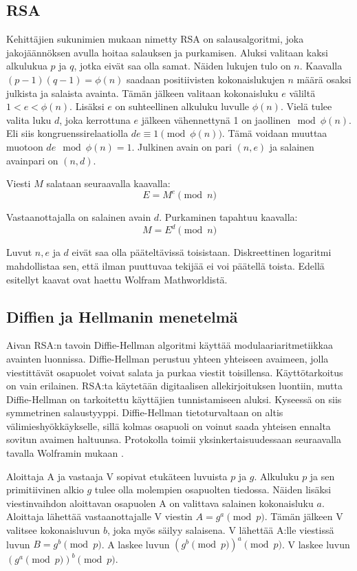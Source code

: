 \documentclass[finnish]{tktltiki2}
\theoremstyle{definition}
\theoremstyle{remark}
\begin{document}
\subsection{RSA}

Kehittäjien sukunimien mukaan nimetty RSA on salausalgoritmi, joka jakojäännöksen avulla hoitaa salauksen ja purkamisen. Aluksi valitaan kaksi alkulukua $p$ ja $q$, jotka eivät saa olla samat. Näiden lukujen tulo on $n$. Kaavalla $(p-1)(q-1) = \phi(n)$ saadaan positiivisten kokonaislukujen $n$ määrä osaksi julkista ja salaista avainta. Tämän jälkeen valitaan kokonaisluku $e$ väliltä $1 < e < \phi(n)$. Lisäksi $e$ on suhteellinen alkuluku luvulle $\phi(n)$. Vielä tulee valita luku $d$, joka kerrottuna $e$ jälkeen vähennettynä 1 on jaollinen$\mod{\phi(n)}$. Eli siis kongruenssirelaatiolla $d e \equiv 1\pmod{\phi(n)}$. Tämä voidaan muuttaa muotoon $de \mod{\phi(n)} = 1$. Julkinen avain on pari $(n, e)$ ja salainen avainpari on $(n, d)$.   

Viesti $M$ salataan seuraavalla kaavalla: $$E = M^e \pmod{n}$$

Vastaanottajalla on salainen avain $d$. Purkaminen tapahtuu kaavalla: 
$$ M = E^d \pmod{n} $$

Luvut $n, e$ ja $d$ eivät saa olla pääteltävissä toisistaan. Diskreettinen logaritmi mahdollistaa sen, että ilman puuttuvaa tekijää ei voi päätellä toista. Edellä esitellyt kaavat ovat haettu Wolfram Mathworldistä. \cite{math1}


\subsection{Diffien ja Hellmanin menetelmä}

Aivan RSA:n tavoin Diffie-Hellman algoritmi käyttää modulaariaritmetiikkaa avainten luonnissa. Diffie-Hellman perustuu yhteen yhteiseen avaimeen, jolla viestittävät osapuolet voivat salata ja purkaa viestit toisillensa. Käyttötarkoitus on vain erilainen. RSA:ta käytetään digitaalisen allekirjoituksen luontiin, mutta Diffie-Hellman on tarkoitettu käyttäjien tunnistamiseen aluksi. Kyseessä on siis symmetrinen salaustyyppi. Diffie-Hellman tietoturvaltaan on altis välimieshyökkäykselle, sillä kolmas osapuoli on voinut saada yhteisen ennalta sovitun avaimen haltuunsa. Protokolla toimii yksinkertaisuudessaan seuraavalla tavalla Wolframin mukaan \cite{math2}.

Aloittaja A ja vastaaja V sopivat etukäteen luvuista $p$ ja $g$. Alkuluku  $p$ ja sen primitiivinen alkio $g$ tulee olla molempien osapuolten tiedossa. Näiden lisäksi viestinvaihdon aloittavan osapuolen A on valittava salainen kokonaisluku $a$. Aloittaja lähettää vastaanottajalle V viestin $A = g^a \pmod{p}$. Tämän jälkeen V valitsee kokonaisluvun $b$, joka myös säilyy salaisena. V lähettää A:lle viestissä luvun $B = g^b \pmod{p}$. A laskee luvun $(g^b \pmod{p})^a \pmod{p}$. V laskee luvun $(g^a \pmod{p})^b \pmod{p}$.
\end{document}
